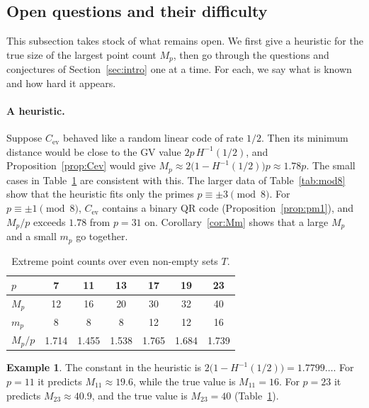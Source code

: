 \documentclass[12pt,letterpaper]{article}
\theoremstyle{definition}
\newtheorem{example}[theorem]{Example}
\theoremstyle{remark}
\numberwithin{equation}{section}
\newcommand{\Cev}{C_{\mathrm{ev}}}
\begin{document}
\subsection{Open questions and their difficulty}

This subsection takes stock of what remains open. We first give a heuristic for the
true size of the largest point count $M_p$, then go through the questions and
conjectures of Section~\ref{sec:intro} one at a time. For each, we say what is known
and how hard it appears.

\paragraph{A heuristic.} Suppose $\Cev$ behaved like a random linear code of rate
$1/2$. Then its minimum distance would be close to the GV value $2p\,H^{-1}(1/2)$,
and Proposition~\ref{prop:Cev} would give
$M_p\approx2\big(1-H^{-1}(1/2)\big)p\approx1.78p$. The small cases in
Table~\ref{tab:Mp} are consistent with this. The larger data of
Table~\ref{tab:mod8} show that the heuristic fits only the primes
$p\equiv\pm3\pmod8$. For $p\equiv\pm1\pmod 8$, $\Cev$ contains a binary QR code
(Proposition~\ref{prop:pm1}), and $M_p/p$ exceeds $1.78$ from $p=31$ on.
Corollary~\ref{cor:Mm} shows that a large $M_p$ and a small $m_p$ go together.

\begin{table}[ht]
\centering
\begin{tabular}{@{}lcccccc@{}}
\toprule
$p$ & 7 & 11 & 13 & 17 & 19 & 23\\
\midrule
$M_p$ & 12 & 16 & 20 & 30 & 32 & 40\\
$m_p$ & 8 & 8 & 8 & 12 & 12 & 16\\
$M_p/p$ & 1.714 & 1.455 & 1.538 & 1.765 & 1.684 & 1.739\\
\bottomrule
\end{tabular}
\caption{Extreme point counts over even non-empty sets $T$.}
\label{tab:Mp}
\end{table}

\begin{example}\label{ex:heuristic}
The constant in the heuristic is $2\big(1-H^{-1}(1/2)\big)=1.7799\ldots$. For
$p=11$ it predicts $M_{11}\approx19.6$, while the true value is $M_{11}=16$. For
$p=23$ it predicts $M_{23}\approx40.9$, and the true value is $M_{23}=40$
(Table~\ref{tab:Mp}).
\end{example}
\end{document}
